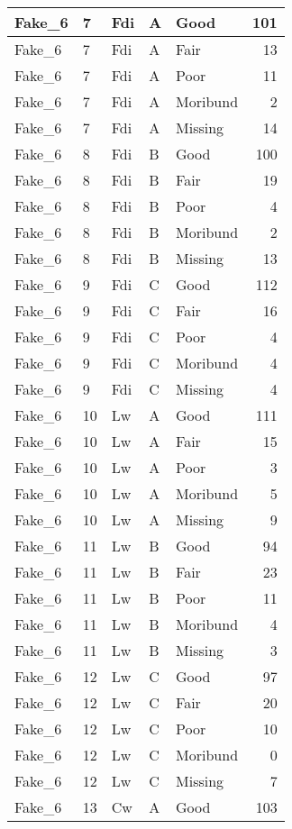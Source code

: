 \documentclass[
]{article}
\begin{document}
\begin{tabular}{l|l|l|l|l|r}
\hline
Fake\_6 & 7 & Fdi & A & Good & 101\\
\hline
Fake\_6 & 7 & Fdi & A & Fair & 13\\
\hline
Fake\_6 & 7 & Fdi & A & Poor & 11\\
\hline
Fake\_6 & 7 & Fdi & A & Moribund & 2\\
\hline
Fake\_6 & 7 & Fdi & A & Missing & 14\\
\hline
Fake\_6 & 8 & Fdi & B & Good & 100\\
\hline
Fake\_6 & 8 & Fdi & B & Fair & 19\\
\hline
Fake\_6 & 8 & Fdi & B & Poor & 4\\
\hline
Fake\_6 & 8 & Fdi & B & Moribund & 2\\
\hline
Fake\_6 & 8 & Fdi & B & Missing & 13\\
\hline
Fake\_6 & 9 & Fdi & C & Good & 112\\
\hline
Fake\_6 & 9 & Fdi & C & Fair & 16\\
\hline
Fake\_6 & 9 & Fdi & C & Poor & 4\\
\hline
Fake\_6 & 9 & Fdi & C & Moribund & 4\\
\hline
Fake\_6 & 9 & Fdi & C & Missing & 4\\
\hline
Fake\_6 & 10 & Lw & A & Good & 111\\
\hline
Fake\_6 & 10 & Lw & A & Fair & 15\\
\hline
Fake\_6 & 10 & Lw & A & Poor & 3\\
\hline
Fake\_6 & 10 & Lw & A & Moribund & 5\\
\hline
Fake\_6 & 10 & Lw & A & Missing & 9\\
\hline
Fake\_6 & 11 & Lw & B & Good & 94\\
\hline
Fake\_6 & 11 & Lw & B & Fair & 23\\
\hline
Fake\_6 & 11 & Lw & B & Poor & 11\\
\hline
Fake\_6 & 11 & Lw & B & Moribund & 4\\
\hline
Fake\_6 & 11 & Lw & B & Missing & 3\\
\hline
Fake\_6 & 12 & Lw & C & Good & 97\\
\hline
Fake\_6 & 12 & Lw & C & Fair & 20\\
\hline
Fake\_6 & 12 & Lw & C & Poor & 10\\
\hline
Fake\_6 & 12 & Lw & C & Moribund & 0\\
\hline
Fake\_6 & 12 & Lw & C & Missing & 7\\
\hline
Fake\_6 & 13 & Cw & A & Good & 103\\

\end{tabular}
\end{document}
